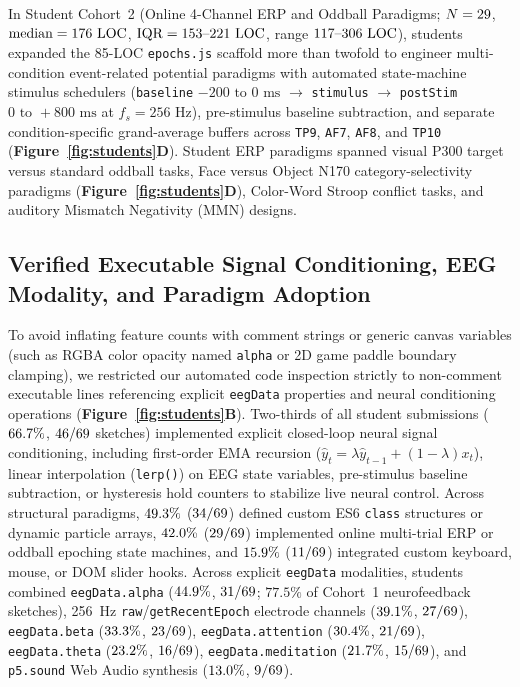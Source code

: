 \documentclass[10pt,twocolumn]{article}
\begin{document}
In Student Cohort~2 (Online 4-Channel ERP and Oddball Paradigms; $N = 29$, $\text{median} = 176\text{ LOC}$, $\text{IQR} = 153\text{--}221\text{ LOC}$, range $117\text{--}306\text{ LOC}$), students expanded the 85-LOC \texttt{epochs.js} scaffold more than twofold to engineer multi-condition event-related potential paradigms with automated state-machine stimulus schedulers (\texttt{baseline} $-200\text{ to }0\text{ ms}$ $\rightarrow$ \texttt{stimulus} $\rightarrow$ \texttt{postStim} $0\text{ to }+800\text{ ms}$ at $f_s = 256\text{ Hz}$), pre-stimulus baseline subtraction, and separate condition-specific grand-average buffers across \texttt{TP9}, \texttt{AF7}, \texttt{AF8}, and \texttt{TP10} (\textbf{Figure~\ref{fig:students}D}). Student ERP paradigms spanned visual P300 target versus standard oddball tasks, Face versus Object N170 category-selectivity paradigms (\textbf{Figure~\ref{fig:students}D}), Color-Word Stroop conflict tasks, and auditory Mismatch Negativity (MMN) designs.

\subsection{Verified Executable Signal Conditioning, EEG Modality, and Paradigm Adoption}
To avoid inflating feature counts with comment strings or generic canvas variables (such as RGBA color opacity named \texttt{alpha} or 2D game paddle boundary clamping), we restricted our automated code inspection strictly to non-comment executable lines referencing explicit \texttt{eegData} properties and neural conditioning operations (\textbf{Figure~\ref{fig:students}B}). Two-thirds of all student submissions ($66.7\%$, $46/69$ sketches) implemented explicit closed-loop neural signal conditioning, including first-order EMA recursion ($\hat{y}_t = \lambda\hat{y}_{t-1} + (1-\lambda)x_t$), linear interpolation (\texttt{lerp()}) on EEG state variables, pre-stimulus baseline subtraction, or hysteresis hold counters to stabilize live neural control. Across structural paradigms, $49.3\%$ ($34/69$) defined custom ES6 \texttt{class} structures or dynamic particle arrays, $42.0\%$ ($29/69$) implemented online multi-trial ERP or oddball epoching state machines, and $15.9\%$ ($11/69$) integrated custom keyboard, mouse, or DOM slider hooks. Across explicit \texttt{eegData} modalities, students combined \texttt{eegData.alpha} ($44.9\%$, $31/69$; $77.5\%$ of Cohort~1 neurofeedback sketches), 256~Hz \texttt{raw}/\texttt{getRecentEpoch} electrode channels ($39.1\%$, $27/69$), \texttt{eegData.beta} ($33.3\%$, $23/69$), \texttt{eegData.attention} ($30.4\%$, $21/69$), \texttt{eegData.theta} ($23.2\%$, $16/69$), \texttt{eegData.meditation} ($21.7\%$, $15/69$), and \texttt{p5.sound} Web Audio synthesis ($13.0\%$, $9/69$).
\end{document}
